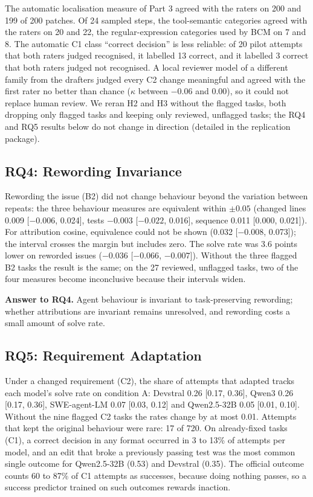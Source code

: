 \documentclass[conference]{IEEEtran}
\newcommand{\bcm}{\textsc{BCM}}
\begin{document}
The automatic localisation measure of Part 3 agreed with the raters on 200 and 199 of 200 patches. Of 24 sampled steps, the tool-semantic categories agreed with the raters on 20 and 22, the regular-expression categories used by \bcm{} on 7 and 8. The automatic C1 class ``correct decision'' is less reliable: of 20 pilot attempts that both raters judged recognised, it labelled 13 correct, and it labelled 3 correct that both raters judged not recognised. A local reviewer model of a different family from the drafters judged every C2 change meaningful and agreed with the first rater no better than chance ($\kappa$ between $-0.06$ and $0.00$), so it could not replace human review. We reran H2 and H3 without the flagged tasks, both dropping only flagged tasks and keeping only reviewed, unflagged tasks; the RQ4 and RQ5 results below do not change in direction (detailed in the replication package).

\subsection{RQ4: Rewording Invariance}
\label{sec:rq4}
Rewording the issue (B2) did not change behaviour beyond the variation between repeats: the three behaviour measures are equivalent within $\pm0.05$ (changed lines 0.009 [$-0.006$, 0.024], tests $-0.003$ [$-0.022$, 0.016], sequence 0.011 [0.000, 0.021]). For attribution cosine, equivalence could not be shown (0.032 [$-0.008$, 0.073]); the interval crosses the margin but includes zero. The solve rate was 3.6 points lower on reworded issues ($-0.036$ [$-0.066$, $-0.007$]). Without the three flagged B2 tasks the result is the same; on the 27 reviewed, unflagged tasks, two of the four measures become inconclusive because their intervals widen.

\textbf{Answer to RQ4.} Agent behaviour is invariant to task-preserving rewording; whether attributions are invariant remains unresolved, and rewording costs a small amount of solve rate.

\subsection{RQ5: Requirement Adaptation}
\label{sec:rq5}
Under a changed requirement (C2), the share of attempts that adapted tracks each model's solve rate on condition A: Devstral 0.26 [0.17, 0.36], Qwen3 0.26 [0.17, 0.36], SWE-agent-LM 0.07 [0.03, 0.12] and Qwen2.5-32B 0.05 [0.01, 0.10]. Without the nine flagged C2 tasks the rates change by at most 0.01. Attempts that kept the original behaviour were rare: 17 of 720. On already-fixed tasks (C1), a correct decision in any format occurred in 3 to 13\% of attempts per model, and an edit that broke a previously passing test was the most common single outcome for Qwen2.5-32B (0.53) and Devstral (0.35). The official outcome counts 60 to 87\% of C1 attempts as successes, because doing nothing passes, so a success predictor trained on such outcomes rewards inaction.
\end{document}

